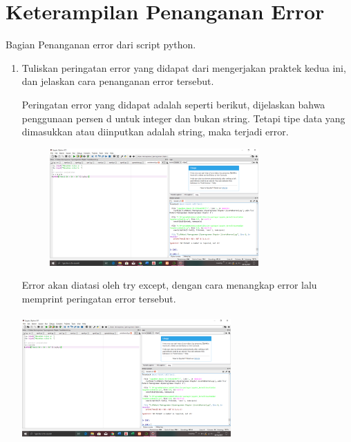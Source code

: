 \documentclass{article}
\begin{document}
\section{Keterampilan Penanganan Error}
Bagian Penanganan error dari script python.
\begin{enumerate}
\item
Tuliskan peringatan error yang didapat dari mengerjakan praktek kedua ini, dan jelaskan cara penanganan error tersebut.
\par Peringatan error yang didapat adalah seperti berikut, dijelaskan bahwa penggunaan persen d untuk integer dan bukan string. Tetapi tipe data yang dimasukkan atau diinputkan adalah string, maka terjadi error.
\begin{figure}[h]
\centerline{\includegraphics[width=8cm]{figures/contoherror2.png}}
\end{figure}

\par Error akan diatasi oleh try except, dengan cara menangkap error lalu memprint peringatan error tersebut.
\paragraph{}
\centerline{\includegraphics[width=8cm]{figures/contoherror2.png}}



\end{enumerate}
\end{document}
